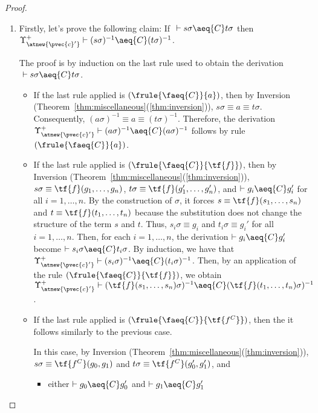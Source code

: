 \begin{proof}
\begin{enumerate}
\item Firstly, let's prove the following claim: If $~\vdash s\sigma \aeq{C} t\sigma$ then $\Upsilon^+_{\atnew{\pvec{c}'}} \vdash (s\sigma)^{-1} \aeq{C} (t\sigma)^{-1}$.


     The proof is by induction on the last rule used to obtain the derivation $~\vdash s\sigma \aeq{C} t\sigma$.

         \begin{itemize}
             \item If the last rule applied is $(\frule{\faeq{C}}{a})$, then by Inversion (Theorem~\ref{thm:miscellaneous}(\ref{thm:inversion})), $s\sigma \equiv a \equiv t\sigma$. Consequently, $(a\sigma)^{-1} \equiv a \equiv (t\sigma)^{-1}$. Therefore, the derivation $\Upsilon^+_{\atnew{\pvec{c}'}} \vdash (a\sigma)^{-1} \aeq{C} (a\sigma)^{-1}$ follows by rule $(\frule{\faeq{C}}{a})$.

             \item If the last rule applied is $(\frule{\faeq{C}}{\tf{f}})$, then by Inversion (Theorem~\ref{thm:miscellaneous}(\ref{thm:inversion})), $s\sigma \equiv \tf{f}(g_1,\ldots,g_n)$, $t\sigma \equiv \tf{f}(g_1',\ldots,g_n')$,
              and $\vdash g_i \aeq{C} g_i'$ for all $i = 1,\ldots,n$.
              By the construction of $\sigma$, it forces $s \equiv \tf{f}(s_1,\ldots,s_n)$ and $t \equiv \tf{f}(t_1,\ldots,t_n)$ because the substitution does not  change the structure of the term $s$ and $t$. Thus, $s_i\sigma \equiv g_i$ and $t_i\sigma \equiv g_i'$ for all $i=1,\ldots,n$. Then, for each $i=1,\ldots,n$, the derivation $\vdash g_i \aeq{C} g_i'$ become $\vdash s_i\sigma \aeq{C} t_i\sigma$. By induction, we have that  $\Upsilon^+_{\atnew{\pvec{c}'}} \vdash (s_i\sigma)^{-1} \aeq{C} (t_i\sigma)^{-1}$. Then, by an application of the rule $(\frule{\faeq{C}}{\tf{f}})$, we obtain $\Upsilon^+_{\atnew{\pvec{c}'}} \vdash (\tf{f}(s_1,\ldots,s_n)\sigma)^{-1} \aeq{C} (\tf{f}(t_1,\ldots,t_n)\sigma)^{-1}$.

              \item If the last rule applied is $(\frule{\faeq{C}}{\tf{f^C}})$, then the it follows similarly to the previous case.

               In this case, by Inversion (Theorem~\ref{thm:miscellaneous}(\ref{thm:inversion})), $s\sigma \equiv \tf{f^C}(g_0,g_1)$ and $t\sigma \equiv \tf{f^C}(g_0',g_1')$, and
               \begin{itemize}
            \item  either $\vdash g_0 \aeq{C} g_0'$ and $\vdash g_1 \aeq{C} g_1'$


\end{itemize}
\end{itemize}
\end{enumerate}
\end{proof}
